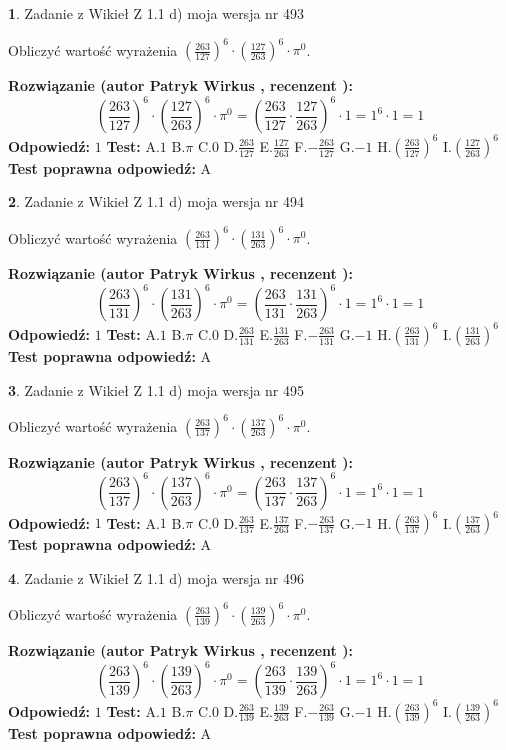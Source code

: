 \documentclass[12pt, a4paper]{article}
\theoremstyle{definition} %
\newtheorem{zad}{}
\newcommand{\zadStart}[1]{\begin{zad}#1\newline}
\newcommand{\zadStop}{\end{zad}}
\newcommand{\rozwStart}[2]{\noindent \textbf{Rozwiązanie (autor #1 , recenzent #2): }\newline}
\newcommand{\rozwStop}{\newline}
\newcommand{\odpStart}{\noindent \textbf{Odpowiedź:}\newline}
\newcommand{\odpStop}{\newline}
\newcommand{\testStart}{\noindent \textbf{Test:}\newline}
\newcommand{\testStop}{\newline}
\newcommand{\kluczStart}{\noindent \textbf{Test poprawna odpowiedź:}\newline}
\newcommand{\kluczStop}{\newline}
\begin{document}
\zadStart{Zadanie z Wikieł Z 1.1 d) moja wersja nr 493}

Obliczyć wartość wyrażenia $(\frac{263}{127})^{6} \cdot (\frac{127}{263})^{6} \cdot \pi^{0}$.
\zadStop
\rozwStart{Patryk Wirkus}{}
$$(\frac{263}{127})^{6} \cdot (\frac{127}{263})^{6} \cdot \pi^{0} = (\frac{263}{127} \cdot \frac{127}{263})^{6} \cdot 1 = 1^{6} \cdot 1 = 1$$
\rozwStop
\odpStart
$1$
\odpStop
\testStart
A.$1$ B.$\pi$ C.$0$ D.$\frac{263}{127}$ E.$\frac{127}{263}$
F.$-\frac{263}{127}$ G.$-1$
H.$(\frac{263}{127})^{6}$
I.$(\frac{127}{263})^{6}$
\testStop
\kluczStart
A
\kluczStop



\zadStart{Zadanie z Wikieł Z 1.1 d) moja wersja nr 494}

Obliczyć wartość wyrażenia $(\frac{263}{131})^{6} \cdot (\frac{131}{263})^{6} \cdot \pi^{0}$.
\zadStop
\rozwStart{Patryk Wirkus}{}
$$(\frac{263}{131})^{6} \cdot (\frac{131}{263})^{6} \cdot \pi^{0} = (\frac{263}{131} \cdot \frac{131}{263})^{6} \cdot 1 = 1^{6} \cdot 1 = 1$$
\rozwStop
\odpStart
$1$
\odpStop
\testStart
A.$1$ B.$\pi$ C.$0$ D.$\frac{263}{131}$ E.$\frac{131}{263}$
F.$-\frac{263}{131}$ G.$-1$
H.$(\frac{263}{131})^{6}$
I.$(\frac{131}{263})^{6}$
\testStop
\kluczStart
A
\kluczStop



\zadStart{Zadanie z Wikieł Z 1.1 d) moja wersja nr 495}

Obliczyć wartość wyrażenia $(\frac{263}{137})^{6} \cdot (\frac{137}{263})^{6} \cdot \pi^{0}$.
\zadStop
\rozwStart{Patryk Wirkus}{}
$$(\frac{263}{137})^{6} \cdot (\frac{137}{263})^{6} \cdot \pi^{0} = (\frac{263}{137} \cdot \frac{137}{263})^{6} \cdot 1 = 1^{6} \cdot 1 = 1$$
\rozwStop
\odpStart
$1$
\odpStop
\testStart
A.$1$ B.$\pi$ C.$0$ D.$\frac{263}{137}$ E.$\frac{137}{263}$
F.$-\frac{263}{137}$ G.$-1$
H.$(\frac{263}{137})^{6}$
I.$(\frac{137}{263})^{6}$
\testStop
\kluczStart
A
\kluczStop



\zadStart{Zadanie z Wikieł Z 1.1 d) moja wersja nr 496}

Obliczyć wartość wyrażenia $(\frac{263}{139})^{6} \cdot (\frac{139}{263})^{6} \cdot \pi^{0}$.
\zadStop
\rozwStart{Patryk Wirkus}{}
$$(\frac{263}{139})^{6} \cdot (\frac{139}{263})^{6} \cdot \pi^{0} = (\frac{263}{139} \cdot \frac{139}{263})^{6} \cdot 1 = 1^{6} \cdot 1 = 1$$
\rozwStop
\odpStart
$1$
\odpStop
\testStart
A.$1$ B.$\pi$ C.$0$ D.$\frac{263}{139}$ E.$\frac{139}{263}$
F.$-\frac{263}{139}$ G.$-1$
H.$(\frac{263}{139})^{6}$
I.$(\frac{139}{263})^{6}$
\testStop
\kluczStart
A
\kluczStop
\end{document}
